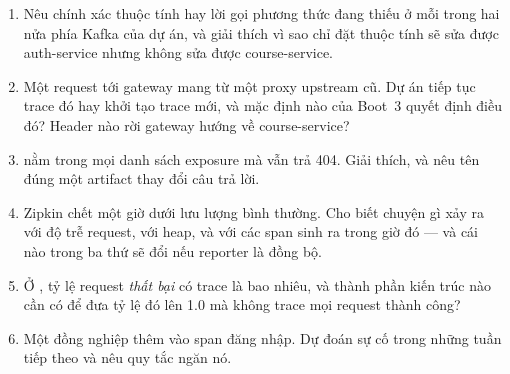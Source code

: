 \begin{quiz}
\begin{enumerate}
  \item Nêu chính xác thuộc tính hay lời gọi phương thức đang thiếu ở
  mỗi trong hai nửa phía Kafka của dự án, và giải thích vì sao chỉ đặt
  thuộc tính sẽ sửa được auth-service nhưng không sửa được
  course-service.
  \item Một request tới gateway mang  từ một proxy
  upstream cũ. Dự án tiếp tục trace đó hay khởi tạo trace mới, và mặc
  định nào của Boot~3 quyết định điều đó? Header nào rời gateway hướng
  về course-service?
  \item {} nằm trong mọi danh sách exposure
  mà vẫn trả 404. Giải thích, và nêu tên đúng một artifact thay đổi câu
  trả lời.
  \item Zipkin chết một giờ dưới lưu lượng bình thường. Cho biết chuyện
  gì xảy ra với độ trễ request, với heap, và với các span sinh ra trong
  giờ đó --- và cái nào trong ba thứ sẽ đổi nếu reporter là đồng bộ.
  \item Ở , tỷ lệ request \emph{thất bại} có
  trace là bao nhiêu, và thành phần kiến trúc nào cần có để đưa tỷ lệ
  đó lên 1.0 mà không trace mọi request thành công?
  \item Một đồng nghiệp thêm 
  vào span đăng nhập. Dự đoán sự cố trong những tuần tiếp theo và nêu
  quy tắc ngăn nó.
\end{enumerate}
\end{quiz}
